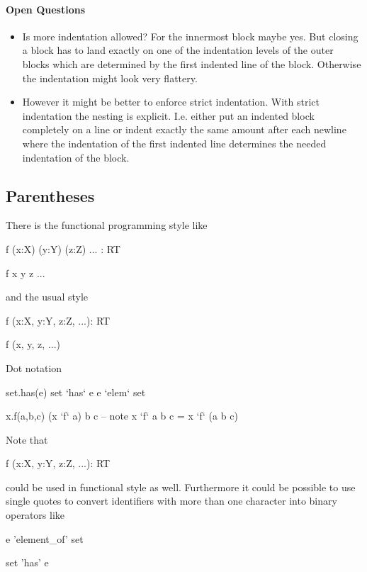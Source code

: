 \paragraph{Open Questions}
\begin{itemize}
\item Is more indentation allowed? For the innermost block maybe yes. But
  closing a block has to land exactly on one of the indentation levels of the
  outer blocks which are determined by the first indented line of the
  block. Otherwise the indentation might look very flattery.

\item
  However it might be better to enforce strict indentation. With strict
  indentation the nesting is explicit. I.e. either put an indented block
  completely on a line or indent exactly the same amount after each newline
  where the indentation of the first indented line determines the needed
  indentation of the block.
\end{itemize}













\subsection{Parentheses}

There is the functional programming style like
%
\begin{alba}
  f (x:X) (y:Y) (z:Z) ... : RT

  f x y z ...
\end{alba}
%
and the usual style
%
\begin{alba}
  f (x:X, y:Y, z:Z, ...): RT

  f (x, y, z, ...)
\end{alba}
%
%
Dot notation
%
\begin{alba}
  set.has(e)                           set `has` e
                                       e `elem` set

  x.f(a,b,c)                           (x `f` a) b c
                                       -- note
                                       x `f` a b c =  x `f` (a b c)
\end{alba}
%
Note that
%
\begin{alba}
  f (x:X, y:Y, z:Z, ...): RT
\end{alba}
%
could be used in functional style as well. Furthermore it could be possible to
use single quotes to convert identifiers with more than one character into
binary operators like
%
\begin{alba}
  e 'element_of' set

  set 'has' e
\end{alba}
%

